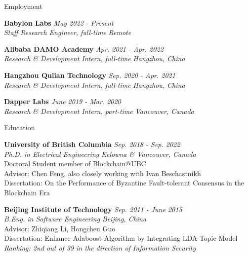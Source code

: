 \documentclass{resume} %
\begin{document}

\begin{rSection}{Employment}

{\bf Babylon Labs} \hfill {\em May 2022 - Present} \\ 
{\em Staff Research Engineer, full-time} \hfill {\em Remote}

{\bf Alibaba DAMO Academy} \hfill {\em Apr. 2021 - Apr. 2022} \\ 
{\em Research \& Development Intern, full-time} \hfill {\em Hangzhou, China}

{\bf Hangzhou Qulian Technology} \hfill {\em Sep. 2020 - Apr. 2021} \\ 
{\em Research \& Development Intern, full-time} \hfill {\em Hangzhou, China}

{\bf Dapper Labs} \hfill {\em June 2019 - Mar. 2020} \\ 
{\em Research \& Development Intern, part-time} \hfill {\em Vancouver, Canada}

\end{rSection}

\begin{rSection}{Education}

{\bf University of British Columbia} \hfill {\em Sep. 2018 - Sep. 2022} \\ 
{\em Ph.D. in Electrical Engineering} \hfill {\em Kelowna \& Vancouver, Canada}\\
Doctoral Student member of Blockchain@UBC \\
Advisor: Chen Feng, also closely working with Ivan Beschastnikh\\
Dissertation: On the Performance of Byzantine Fault-tolerant Consensus in the Blockchain Era \smallskip

{\bf Beijing Institute of Technology} \hfill {\em Sep. 2011 - June 2015} \\ 
{\em B.Eng. in Software Engineering} \hfill {\em Beijing, China}\\
Advisor: Zhiqiang Li, Hongchen Guo\\
Dissertation: Enhance Adaboost Algorithm by Integrating LDA Topic Model\\
\em Ranking: 2nd out of 39 in the direction of Information Security

\end{rSection}
\end{document}
